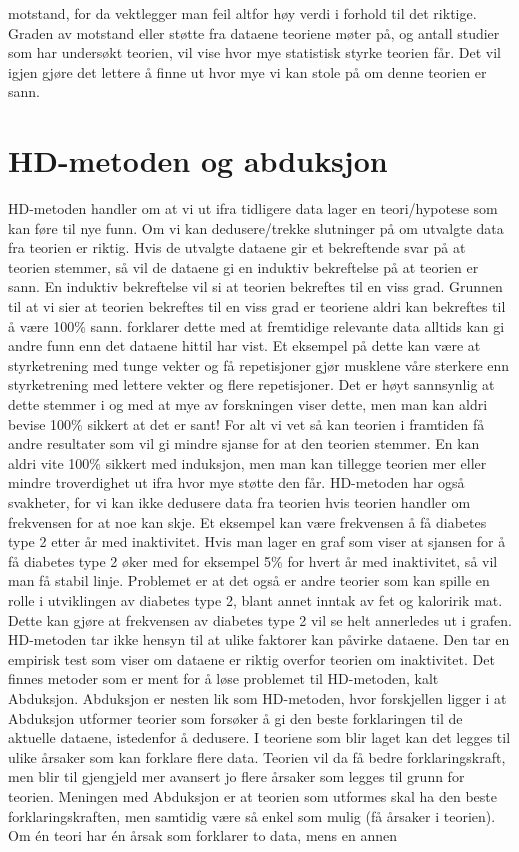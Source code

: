 \documentclass[
]{book}
\begin{document}
motstand, for da vektlegger man feil altfor høy verdi i forhold til det riktige. Graden av motstand eller støtte fra dataene teoriene møter på, og antall studier som har undersøkt teorien, vil vise hvor mye statistisk styrke teorien får. Det vil igjen gjøre det lettere å finne ut hvor mye vi kan stole på om denne teorien er sann.

\hypertarget{hd-metoden-og-abduksjon}{%
\section{HD-metoden og abduksjon}\label{hd-metoden-og-abduksjon}}

HD-metoden handler om at vi ut ifra tidligere data lager en teori/hypotese som kan føre til nye funn. Om vi kan dedusere/trekke slutninger på om utvalgte data fra teorien er riktig. Hvis de utvalgte dataene gir et bekreftende svar på at teorien stemmer, så vil de dataene gi en induktiv bekreftelse på at teorien er sann. En induktiv bekreftelse vil si at teorien bekreftes til en viss grad. Grunnen til at vi sier at teorien bekreftes til en viss grad er teoriene aldri kan bekreftes til å være 100\% sann. \citet{hempel1966} forklarer dette med at fremtidige relevante data alltids kan gi andre funn enn det dataene hittil har vist. Et eksempel på dette kan være at styrketrening med tunge vekter og få repetisjoner gjør musklene våre sterkere enn styrketrening med lettere vekter og flere repetisjoner. Det er høyt sannsynlig at dette stemmer i og med at mye av forskningen viser dette, men man kan aldri bevise 100\% sikkert at det er sant! For alt vi vet så kan teorien i framtiden få andre resultater som vil gi mindre sjanse for at den teorien stemmer. En kan aldri vite 100\% sikkert med induksjon, men man kan tillegge teorien mer eller mindre troverdighet ut ifra hvor mye støtte den får. HD-metoden har også svakheter, for vi kan ikke dedusere data fra teorien hvis teorien handler om frekvensen for at noe kan skje. Et eksempel kan være frekvensen å få diabetes type 2 etter år med inaktivitet. Hvis man lager en graf som viser at sjansen for å få diabetes type 2 øker med for eksempel 5\% for hvert år med inaktivitet, så vil man få stabil linje. Problemet er at det også er andre teorier som kan spille en rolle i utviklingen av diabetes type 2, blant annet inntak av fet og kaloririk mat. Dette kan gjøre at frekvensen av diabetes type 2 vil se helt annerledes ut i grafen. HD-metoden tar ikke hensyn til at ulike faktorer kan påvirke dataene. Den tar en empirisk test som viser om dataene er riktig overfor teorien om inaktivitet. Det finnes metoder som er ment for å løse problemet til HD-metoden, kalt Abduksjon. Abduksjon er nesten lik som HD-metoden, hvor forskjellen ligger i at Abduksjon utformer teorier som forsøker å gi den beste forklaringen til de aktuelle dataene, istedenfor å dedusere. I teoriene som blir laget kan det legges til ulike årsaker som kan forklare flere data. Teorien vil da få bedre forklaringskraft, men blir til gjengjeld mer avansert jo flere årsaker som legges til grunn for teorien. Meningen med Abduksjon er at teorien som utformes skal ha den beste forklaringskraften, men samtidig være så enkel som mulig (få årsaker i teorien). Om én teori har én årsak som forklarer to data, mens en annen 
\end{document}
